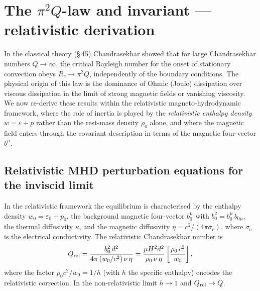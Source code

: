 
\section{The $\pi^{2}Q$-law and invariant --- relativistic derivation}
\label{sec:rel-45}

In the classical theory (\S\,45) Chandrasekhar showed that for large
Chandrasekhar numbers $Q\to\infty$, the critical Rayleigh number for the
onset of stationary convection obeys $R_{c}\to\pi^{2}Q$, independently of
the boundary conditions.  The physical origin of this law is the dominance
of Ohmic (Joule) dissipation over viscous dissipation in the limit of
strong magnetic fields or vanishing viscosity.  We now re-derive these
results within the relativistic magneto-hydrodynamic framework, where the
role of inertia is played by the \emph{relativistic enthalpy density}
$w = \varepsilon + p$ rather than the rest-mass density $\rho_{0}$ alone,
and where the magnetic field enters through the covariant description in
terms of the magnetic four-vector $b^{\mu}$.

\subsection{Relativistic MHD perturbation equations for the inviscid limit}
\label{subsec:rel-45-inviscid}

In the relativistic framework the equilibrium is characterised by the
enthalpy density $w_{0} = \varepsilon_{0} + p_{0}$, the background
magnetic four-vector $b^{\mu}_{0}$ with $b^{2}_{0} = b^{\mu}_{0}\,b_{0\mu}$,
the thermal diffusivity $\kappa$, and the magnetic diffusivity
$\eta = c^{2}/(4\pi\sigma_{\mathrm{e}})$, where $\sigma_{\mathrm{e}}$ is
the electrical conductivity.  The relativistic Chandrasekhar number is
\begin{equation}
  Q_{\mathrm{rel}} = \frac{b^{2}_{0}\,d^{2}}{4\pi\,(w_{0}/c^{2})\,\nu\,\eta}
        = \frac{\mu H^{2} d^{2}}{\rho_{0}\,\nu\,\eta}
          \left[\frac{\rho_{0}\,c^{2}}{w_{0}}\right] ,
  \label{eq:rel-Qrel-def}
\end{equation}
where the factor $\rho_{0}c^{2}/w_{0} = 1/h$ (with $h$ the specific
enthalpy) encodes the relativistic correction.  In the non-relativistic
limit $h\to 1$ and $Q_{\mathrm{rel}}\to Q$.

